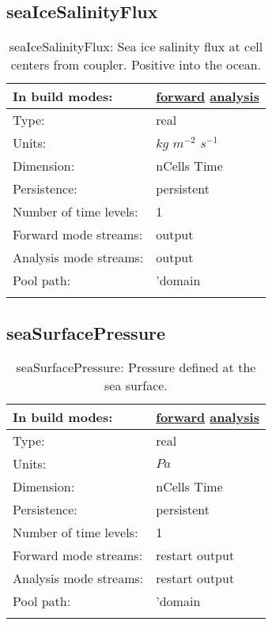 \subsection[seaIceSalinityFlux]{seaIceSalinityFlux}
\label{subsec:var_sec_forcing_seaIceSalinityFlux}
\begin{center}
\begin{longtable}{| p{2.0in} | p{4.0in} |}
        \hline 
        In build modes: & \hyperref[subsec:forward_var_tab_forcing]{forward} \hyperref[subsec:analysis_var_tab_forcing]{analysis} \\
        \hline 
        Type: & real \\
        \hline 
        Units: & $kg$ $m^{-2}$ $s^{-1}$ \\
        \hline 
        Dimension: & nCells Time \\
        \hline 
        Persistence: & persistent \\
        \hline 
        Number of time levels: & 1 \\
        \hline 
		 Forward mode streams: &  output \\
        \hline 
		 Analysis mode streams: &  output \\
        \hline 
            Pool path: & 'domain %
 \\
		 \hline 
    \caption{seaIceSalinityFlux: Sea ice salinity flux at cell centers from coupler. Positive into the ocean.}
\end{longtable}
\end{center}
\subsection[seaSurfacePressure]{seaSurfacePressure}
\label{subsec:var_sec_forcing_seaSurfacePressure}
\begin{center}
\begin{longtable}{| p{2.0in} | p{4.0in} |}
        \hline 
        In build modes: & \hyperref[subsec:forward_var_tab_forcing]{forward} \hyperref[subsec:analysis_var_tab_forcing]{analysis} \\
        \hline 
        Type: & real \\
        \hline 
        Units: & $Pa$ \\
        \hline 
        Dimension: & nCells Time \\
        \hline 
        Persistence: & persistent \\
        \hline 
        Number of time levels: & 1 \\
        \hline 
		 Forward mode streams: &  restart output \\
        \hline 
		 Analysis mode streams: &  restart output \\
        \hline 
            Pool path: & 'domain %
 \\
		 \hline 
    \caption{seaSurfacePressure: Pressure defined at the sea surface.}
\end{longtable}
\end{center}
